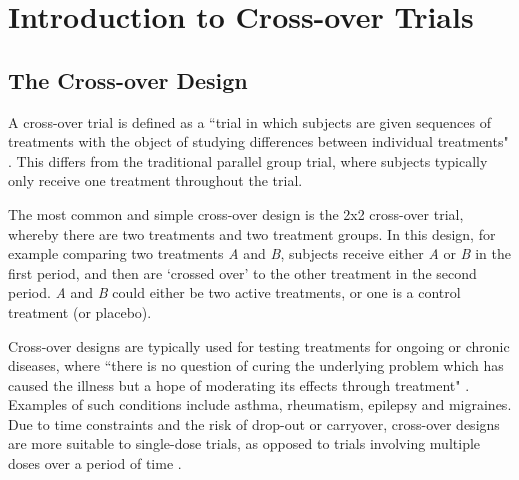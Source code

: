 \documentclass[12pt, TexShade, letterpaper]{report}
\begin{document}
	\tableofcontents\thispagestyle{plain}

 	\clearpage

    \listoffigures\label{listfigures}
    \listoftables\label{listtables}

    \clearpage
	

\chapter{Introduction to Cross-over Trials}\label{chap1}
\section{The Cross-over Design}
A cross-over trial is defined as a ``trial in which subjects are given sequences of treatments with the object of studying differences between individual treatments" \cite{senn2002crossover}. This differs from the traditional parallel group trial, where subjects typically only receive one treatment throughout the trial.

The most common and simple cross-over design is the 2x2 cross-over trial, whereby there are two treatments and two treatment groups. In this design, for example comparing two treatments \textit{A} and \textit{B}, subjects receive either \textit{A} or \textit{B} in the first period, and then are `crossed over' to the other treatment in the second period. \textit{A} and \textit{B} could either be two active treatments, or one is a control treatment (or placebo).

Cross-over designs are typically used for testing treatments for ongoing or chronic diseases, where ``there is no question of curing the underlying problem which has caused the illness but a hope of moderating its effects through treatment" \cite{senn2002crossover}. Examples of such conditions include asthma, rheumatism, epilepsy and migraines. Due to time constraints and the risk of drop-out or carryover, cross-over designs are more suitable to single-dose trials, as opposed to trials involving multiple doses over a period of time \cite{senn2002crossover}.
\end{document}
